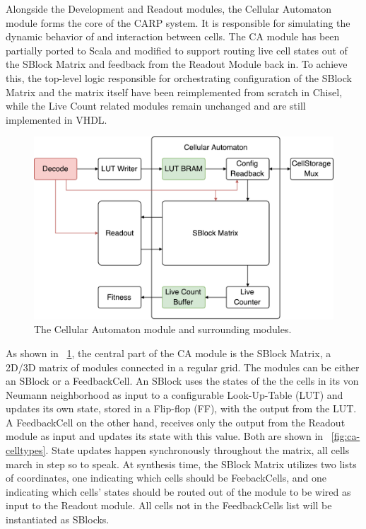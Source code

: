 Alongside the Development and Readout modules, the Cellular Automaton module forms
the core of the CARP system. It is responsible for simulating the dynamic
behavior of and interaction between cells. The CA module has been partially
ported to Scala and modified to support routing live cell states out of the
SBlock Matrix and feedback from the Readout Module back in. To achieve this, the
top-level logic responsible for orchestrating configuration of the SBlock Matrix
and the matrix itself have been reimplemented from scratch in Chisel, while the
Live Count related modules remain unchanged and are still implemented in VHDL.

\begin{figure}[ht]
  \centering
  \includegraphics[width=0.8\linewidth]{fig/ca-io}
  \caption{The Cellular Automaton module and surrounding modules.}
  \label{fig:ca-io}
\end{figure}

As shown in \figurename~\ref{fig:ca-io}, the central part of the CA module is
the SBlock Matrix, a 2D/3D matrix of modules connected in a regular grid. The
modules can be either an SBlock or a FeedbackCell. An SBlock uses the states of
the the cells in its von Neumann neighborhood as input to a configurable
Look-Up-Table (LUT) and updates its own state, stored in a Flip-flop (FF), with
the output from the LUT. A FeedbackCell on the other hand, receives only the
output from the Readout module as input and updates its state with this value.
Both are shown in \figurename~\ref{fig:ca-celltypes}. State updates happen
synchronously throughout the matrix, all cells march in step so to speak. At
synthesis time, the SBlock Matrix utilizes two lists of coordinates, one
indicating which cells should be FeebackCells, and one indicating which cells'
states should be routed out of the module to be wired as input to the Readout
module. All cells not in the FeedbackCells list will be instantiated as SBlocks.

